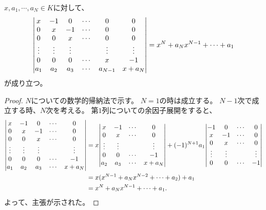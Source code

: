 \begin{proposition}
$x, a_1, \cdots, a_N \in K$に対して、
$$
\mqty|
x & -1 & 0 & \cdots & 0 & 0 \\
0 & x & -1 & \cdots & 0 & 0 \\
0 & 0 & x & \cdots & 0 & 0 \\
\vdots & \vdots & \vdots & & \vdots & \vdots \\
0 & 0 & 0 & \cdots & x & -1 \\
a_1 & a_2 & a_3 & \cdots & a_{N-1} & x+a_N \\
|
= x^N+a_N x^{N-1}+\cdots+a_1
$$
が成り立つ。
\end{proposition}

\begin{proof}
$N$についての数学的帰納法で示す。
$N = 1$の時は成立する。
$N-1$次で成立する時、$N$次を考える。
第$1$列についての余因子展開をすると、
$$
\begin{aligned}
\mqty|
x & -1 & 0 & \cdots & 0 \\
0 & x & -1 & \cdots & 0 \\
0 & 0 & x & \cdots & 0 \\
\vdots & \vdots & \vdots & & \vdots \\
0 & 0 & 0 & \cdots & -1 \\
a_1 & a_2 & a_3 & \cdots & x+a_N \\
|
&=
x
\mqty|
x & -1 & \cdots & 0 \\
0 & x & \cdots & 0 \\
\vdots & \vdots & & \vdots \\
0 & 0 & \cdots & -1 \\
a_2 & a_3 & \cdots & x+a_N \\
|
+(-1)^{N+1}a_1
\mqty|
-1 & 0 & \cdots & 0 \\
x & -1 & \cdots & 0 \\
0 & x & \cdots & 0 \\
\vdots & \vdots & & \vdots \\
0 & 0 & \cdots & -1 \\
| \\
&= x(x^{N-1}+a_N x^{N-2}+\cdots+a_2)+a_1 \\
&= x^N+a_N x^{N-1}+\cdots+a_1.
\end{aligned}
$$
よって、主張が示された。
\end{proof}
